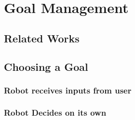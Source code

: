
\chapter{Goal Management} %

\label{chapter-goal_management} %



\section{Related Works}


\section{Choosing a Goal}
\subsection{Robot receives inputs from user}
\subsection{Robot Decides on its own}




